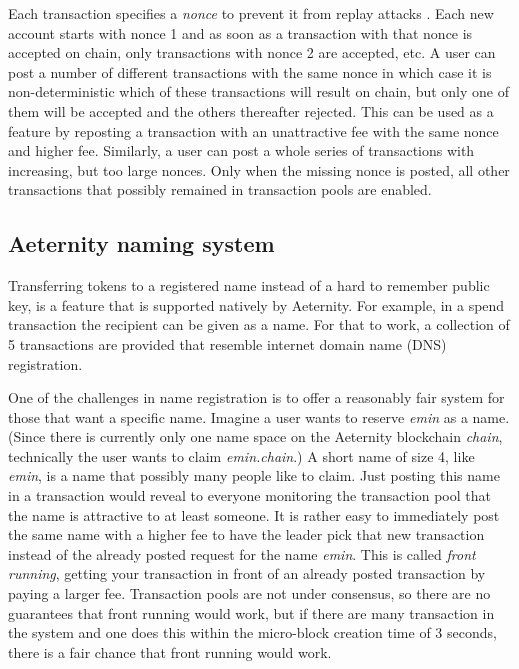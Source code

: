 Each transaction specifies a \textit{nonce}  to prevent it from replay
attacks \cite{Syverson}. Each new account starts with nonce 1 and as
soon as a transaction with that nonce is accepted on chain, only
transactions with nonce 2 are accepted, etc. A user can post a number
of different transactions with the same nonce in which case it is
non-deterministic which of these transactions will result on chain,
but only one of them will be accepted and the others thereafter
rejected. This can be used as a feature by reposting a
transaction with an unattractive fee with the same nonce and higher
fee. Similarly, a user can post a whole series of transactions with
increasing, but too large nonces. Only when the missing nonce is
posted, all other transactions that possibly remained in transaction
pools are enabled.

\subsection{Aeternity naming system}
\label{sect:aens}

Transferring tokens to a registered name instead of a hard to remember
public key, is a feature that is supported natively by Aeternity.
For example, in a spend
transaction the recipient can be given as a name. For that to work, a
collection of 5 transactions are provided that
resemble internet domain name (DNS) registration.

One of the challenges in name registration is to offer a reasonably
fair system for those that want a specific name. Imagine a user wants
to reserve \textit{emin} as a name. (Since there is currently only one
name space on the Aeternity blockchain \textit{chain}, technically the
user wants to claim \textit{emin.chain}.)
A short name of size 4, like \textit{emin}, is a name that
possibly many people like to claim. Just posting this name in a
transaction would reveal to everyone monitoring the
transaction pool that the name is attractive to at least someone. It
is rather easy to
immediately post the same name with a higher fee to have the leader
pick that new transaction instead of the already posted request for
the name \textit{emin}. This is called \textit{front running}, getting
your transaction in front of an already posted transaction by paying a
larger fee. Transaction pools are not under consensus, so there are no
guarantees that front running would work, but if there are many
transaction in the system and one does this within the micro-block
creation time of 3 seconds, there is a fair chance that front running
would work.

